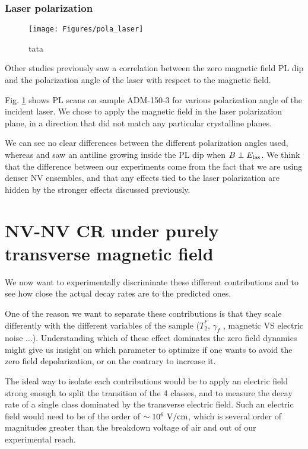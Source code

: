 \documentclass[a4paper,11pt]{report}
\begin{document}
\subsubsection{Laser polarization}
\begin{figure}[h]
\centering
\texttt{[image: Figures/pola\_laser]}
\caption{tata}
\label{pola laser}
\end{figure}

Other studies \citep{anishchik2015low, filimonenko2020weak} previously saw a correlation between the zero magnetic field PL dip and the polarization angle of the laser with respect to the magnetic field. 

Fig. \ref{pola laser} shows PL scans on sample ADM-150-3 for various polarization angle of the incident laser. We chose to apply the magnetic field in the laser polarization plane, in a direction that did not match any particular crystalline planes.

We can see no clear differences between the different polarization angles used, whereas \citep{anishchik2015low} and \citep{filimonenko2020weak} saw an antiline growing inside the PL dip when $B \perp E_{\rm las}$. We think that the difference between our experiments come from the fact that we are using denser NV ensembles, and that any effects tied to the laser polarization are hidden by the stronger effects discussed previously.


\section{NV-NV CR under purely transverse magnetic field}
We now want to experimentally discriminate these different contributions and to see how close the actual decay rates are to the predicted ones. 

One of the reason we want to separate these contributions is that they scale differently with the different variables of the sample ($T_2^*$, $\gamma_f$ , magnetic VS electric noise ...). Understanding which of these effect dominates the zero field dynamics might give us insight on which parameter to optimize if one wants to avoid the zero field depolarization, or on the contrary to increase it.

The ideal way to isolate each contributions would be to apply an electric field strong enough to split the transition of the 4 classes, and to measure the decay rate of a single class dominated by the transverse electric field. Such an electric field would need to be of the order of $\sim 10^6\ \rm{V/cm}$, which is several order of magnitudes greater than the breakdown voltage of air and out of our experimental reach.
\end{document}
